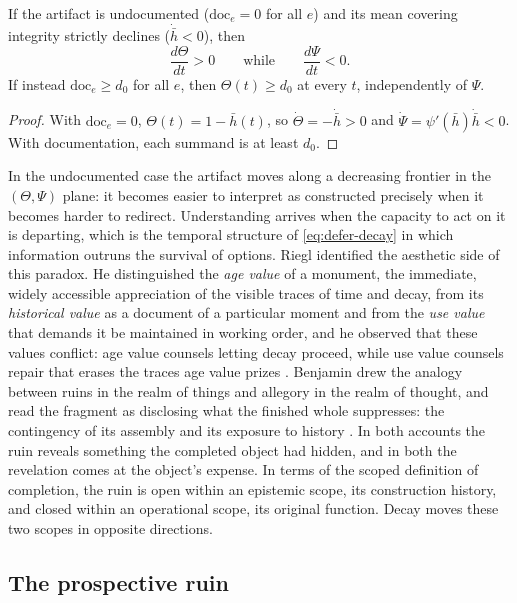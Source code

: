 \begin{proposition}\label{prop:ruin}
If the artifact is undocumented ($\mathrm{doc}_e=0$ for all $e$) and its mean covering integrity strictly declines ($\dot{\bar h}<0$), then
\[
\frac{d\Theta}{dt}>0\qquad\text{while}\qquad\frac{d\Psi}{dt}<0 .
\]
If instead $\mathrm{doc}_e\geq d_0$ for all $e$, then $\Theta(t)\geq d_0$ at every $t$, independently of $\Psi$.
\end{proposition}

\begin{proof}
With $\mathrm{doc}_e=0$, $\Theta(t)=1-\bar h(t)$, so $\dot\Theta=-\dot{\bar h}>0$ and $\dot\Psi=\psi'(\bar h)\dot{\bar h}<0$. With documentation, each summand is at least $d_0$.
\end{proof}

In the undocumented case the artifact moves along a decreasing frontier in the $(\Theta,\Psi)$ plane: it becomes easier to interpret as constructed precisely when it becomes harder to redirect. Understanding arrives when the capacity to act on it is departing, which is the temporal structure of \eqref{eq:defer-decay} in which information outruns the survival of options. Riegl identified the aesthetic side of this paradox. He distinguished the \emph{age value} of a monument, the immediate, widely accessible appreciation of the visible traces of time and decay, from its \emph{historical value} as a document of a particular moment and from the \emph{use value} that demands it be maintained in working order, and he observed that these values conflict: age value counsels letting decay proceed, while use value counsels repair that erases the traces age value prizes \cite{riegl1982}. Benjamin drew the analogy between ruins in the realm of things and allegory in the realm of thought, and read the fragment as disclosing what the finished whole suppresses: the contingency of its assembly and its exposure to history \cite{benjamin1998}. In both accounts the ruin reveals something the completed object had hidden, and in both the revelation comes at the object's expense. In terms of the scoped definition of completion, the ruin is open within an epistemic scope, its construction history, and closed within an operational scope, its original function. Decay moves these two scopes in opposite directions.

\subsection{The prospective ruin}

